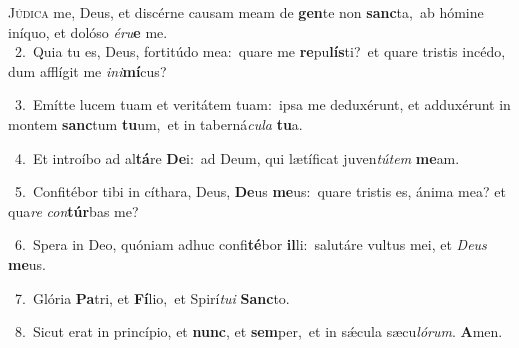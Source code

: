 \lettrine{\initial\textcolor{\initialcolor}{J}}{údica} me, Deus, et discérne causam meam de \textbf{gen}\-te non \textbf{sanc}\-ta,~\star ab hómine iníquo, et dolóso \textit{é}\-\textit{ru}\textbf{e} me.\\
{\numbfont\textcolor{\numbcolor}{~2.}}~Quia tu es, Deus, fortitúdo mea:~\dagger quare me \textbf{re}\-pu\-\textbf{lís}\-ti?~\star et quare tristis incédo, dum afflígit me \textit{in}\-\textit{i}\textbf{mí}cus?\par
{\numbfont\textcolor{\numbcolor}{~3.}}~Emítte lucem tuam et veritátem tuam:~\dagger ipsa me deduxérunt, et adduxérunt in montem \textbf{sanc}\-tum \textbf{tu}\-um,~\star et in taberná\-\textit{cu}\-\textit{la} \textbf{tu}\-a.\par
{\numbfont\textcolor{\numbcolor}{~4.}}~Et introíbo ad al\-\textbf{tá}\-re \textbf{De}\-i:~\star ad Deum, qui lætíficat juven\-\textit{tú}\-\textit{tem} \textbf{me}\-am.\par
{\numbfont\textcolor{\numbcolor}{~5.}}~Confitébor tibi in cíthara, Deus, \textbf{De}\-us \textbf{me}\-us:~\star quare tristis es, ánima mea? et qua\textit{re} \textit{con}\-\textbf{túr}bas me?\par
{\numbfont\textcolor{\numbcolor}{~6.}}~Spera in Deo, quóniam adhuc confi\-\textbf{té}\-bor \textbf{il}\-li:~\star salutáre vultus mei, et \textit{De}\-\textit{us} \textbf{me}\-us.\par
{\numbfont\textcolor{\numbcolor}{~7.}}~Glória \textbf{Pa}\-tri, et \textbf{Fí}\-lio,~\star et Spirí\-\textit{tu}\-\textit{i} \textbf{Sanc}\-to.\par
{\numbfont\textcolor{\numbcolor}{~8.}}~Sicut erat in princípio, et \textbf{nunc}\-, et \textbf{sem}\-per,~\star et in sǽcula sæcu\-\textit{ló}\-\textit{rum}. \textbf{A}\-men.\par
